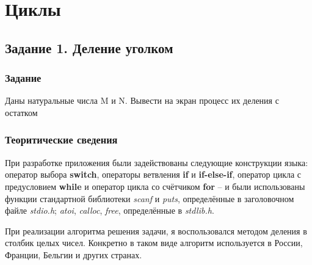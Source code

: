 \documentclass[12pt,a4paper]{report}
\begin{document}
\chapter{Циклы}
\section{Задание 1. Деление уголком}
\subsection{Задание}
\hspace{\parindent}
Даны натуральные числа M и N. Вывести на экран процесс их деления с остатком
\subsection{Теоритические сведения}
\hspace{\parindent}
При разработке приложения были задействованы следующие конструкции языка: оператор выбора \textbf{switch}, операторы ветвления \textbf{if} и \textbf{if-else-if}, оператор цикла с предусловием \textbf{while} и оператор цикла со счётчиком \textbf{for} -- и были использованы функции стандартной библиотеки \textit{scanf} и \textit{puts}, определённые в заголовочном файле \textit{stdio.h}; \textit{atoi}, \textit{calloc}, \textit{free}, определённые в \textit{stdlib.h}.

\hspace{\parindent}
При реализации алгоритма решения задачи, я воспользовался методом деления в столбик целых чисел. Конкретно в таком виде алгоритм используется в России, Франции, Бельгии и других странах.
\end{document}
